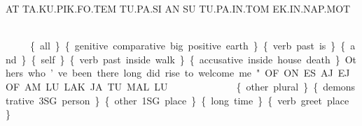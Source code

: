 {AT TA.KU.PIK.FO.TEM TU.PA.SI AN SU TU.PA.IN.TOM EK.IN.NAP.MOT 

\at ~ \ta\ku\pik\fo\tem ~ \tu\pa\si ~ \an ~ \su ~ \tu\pa\Atlanin\tom ~ \\\ek\Atlanin\nap\mot

\{all\} \{genitive comparative big positive earth\} \{verb past is\} \{and\} \{self\} \{verb past inside walk\} \{accusative inside house death\} 

 
 

Others who’ve been there long did rise to welcome me." 

OF.ON ES.AJ.EJ OF.AM.LU LAK.JA TU.MAL.LU 

\of\on ~ \es\aj\ej ~ \of\am\lu ~ \lak\ja ~ \tu\mal\lu

\{other plural\} \{demonstrative 3SG person\} \{other 1SG place\} \{long time\} \{verb greet place\} 



}

